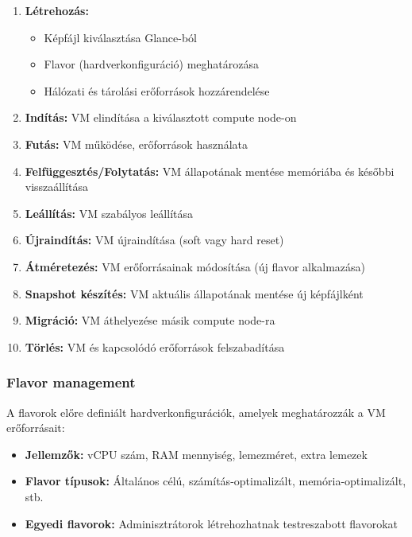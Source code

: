 \documentclass[a4paper,12pt]{article}
\begin{document}
    \begin{enumerate}
        \item \textbf{Létrehozás:}
        \begin{itemize}
            \item Képfájl kiválasztása Glance-ból
            \item Flavor (hardverkonfiguráció) meghatározása
            \item Hálózati és tárolási erőforrások hozzárendelése
        \end{itemize}

        \item \textbf{Indítás:} VM elindítása a kiválasztott compute node-on

        \item \textbf{Futás:} VM működése, erőforrások használata

        \item \textbf{Felfüggesztés/Folytatás:} VM állapotának mentése memóriába és későbbi visszaállítása

        \item \textbf{Leállítás:} VM szabályos leállítása

        \item \textbf{Újraindítás:} VM újraindítása (soft vagy hard reset)

        \item \textbf{Átméretezés:} VM erőforrásainak módosítása (új flavor alkalmazása)

        \item \textbf{Snapshot készítés:} VM aktuális állapotának mentése új képfájlként

        \item \textbf{Migráció:} VM áthelyezése másik compute node-ra

        \item \textbf{Törlés:} VM és kapcsolódó erőforrások felszabadítása
    \end{enumerate}

    \subsubsection{Flavor management}

    A flavorok előre definiált hardverkonfigurációk, amelyek meghatározzák a VM erőforrásait:

    \begin{itemize}
        \item \textbf{Jellemzők:} vCPU szám, RAM mennyiség, lemezméret, extra lemezek
        \item \textbf{Flavor típusok:} Általános célú, számítás-optimalizált, memória-optimalizált, stb.
        \item \textbf{Egyedi flavorok:} Adminisztrátorok létrehozhatnak testreszabott flavorokat
    \end{itemize}
\end{document}
